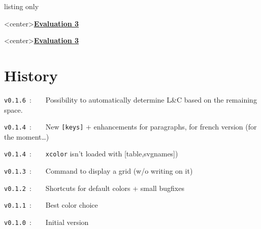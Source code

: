 \documentclass[a4paper]{article}
\begin{document}
\begin{PresentationCode}{listing only}
\begin{PleinePageRuled}[NumLignes]
	\LignePapierRuled[Echelle=1.25,Ligne=2,Couleur=red]<center>{\underline{\cursive\bfseries Evaluation 3}}
	\ParagraphePapierRuled[Ligne=9]{\cursive\lipsum[1]}
\end{PleinePageRuled}
\end{PresentationCode}

\pagebreak

\thispagestyle{empty}

\begin{PleinePageRuled}
	\LignePapierRuled[Echelle=1.25,Ligne=2,Couleur=red]<center>{\underline{\cursive\bfseries Evaluation 3}}
	\ParagraphePapierRuled[Ligne=9]{\cursive\lipsum[1]}
\end{PleinePageRuled}

\pagebreak

\part*{History}

\verb|v0.1.6|~:~~~~Possibility to automatically determine L\&C based on the remaining space.

\verb|v0.1.4|~:~~~~New \texttt{[keys]} + enhancements for paragraphs, for french version (for the moment\dots)

\verb|v0.1.4|~:~~~~\texttt{xcolor} isn't loaded with \textsf{[table,svgnames]})

\verb|v0.1.3|~:~~~~Command to display a grid (w/o writing on it)

\verb|v0.1.2|~:~~~~Shortcuts for default colors + small bugfixes

\verb|v0.1.1|~:~~~~Best color choice

\verb|v0.1.0|~:~~~~Initial version
\end{document}

